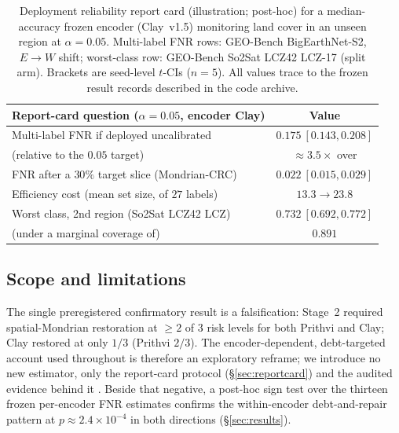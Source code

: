 \documentclass[journal]{IEEEtran}
\renewcommand{\_}{\textunderscore\allowbreak}
\begin{document}
\begin{table}[htbp]\centering\small
\caption{Deployment reliability report card (illustration; post-hoc) for a median-accuracy frozen encoder
(Clay~v1.5) monitoring land cover in an unseen region at $\alpha{=}0.05$. Multi-label FNR rows: GEO-Bench
BigEarthNet-S2, $E\!\to\!W$ shift; worst-class row: GEO-Bench So2Sat LCZ42 LCZ-17 (split arm).
Brackets are seed-level $t$-CIs ($n{=}5$). All values trace to the frozen result
records described in the code archive.}\label{tab:reportcard}
\begin{tabular}{@{}lc@{}}
\toprule
Report-card question ($\alpha{=}0.05$, encoder Clay) & Value \\
\midrule
Multi-label FNR if deployed uncalibrated & $0.175\ [0.143,0.208]$ \\
\quad(relative to the $0.05$ target) & ${\approx}3.5\times$ over \\
FNR after a $30\%$ target slice (Mondrian-CRC) & $0.022\ [0.015,0.029]$ \\
Efficiency cost (mean set size, of $27$ labels) & $13.3\to23.8$ \\
Worst class, 2nd region (So2Sat LCZ42 LCZ) & $0.732\ [0.692,0.772]$ \\
\quad(under a marginal coverage of) & $0.891$ \\
\bottomrule
\end{tabular}
\end{table}

\subsection{Scope and limitations}\label{sec:limitations}
The single preregistered confirmatory result is a falsification: Stage~2 required spatial-Mondrian
restoration at $\ge2$ of $3$ risk levels for both Prithvi and Clay; Clay restored at only $1/3$
(Prithvi $2/3$). The encoder-dependent, debt-targeted account used throughout is therefore an
exploratory reframe; we introduce no new estimator, only the report-card protocol
(\S\ref{sec:reportcard}) and the audited evidence behind it
\citep{vovk2005algorithmic,angelopoulos2024crc}. Beside that negative, a post-hoc sign test over the
thirteen frozen per-encoder FNR estimates confirms the within-encoder debt-and-repair pattern at
$p\approx2.4\times10^{-4}$ in both directions (\S\ref{sec:results}).
\end{document}
